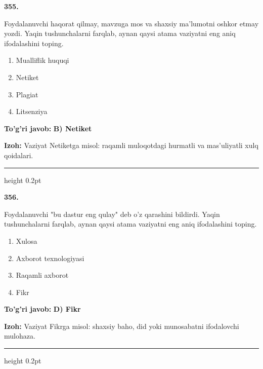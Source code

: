 \documentclass[10pt,a4paper,oneside]{article}
\begin{document}
\noindent\textbf{\color{ink}355.}
\par
Foydalanuvchi haqorat qilmay, mavzuga mos va shaxsiy ma'lumotni oshkor etmay yozdi. Yaqin tushunchalarni farqlab, aynan qaysi atama vaziyatni eng aniq ifodalashini toping.
\begin{enumerate}[label=\Alph*),leftmargin=9mm]
\item Mualliflik huquqi
\item Netiket
\item Plagiat
\item Litsenziya
\end{enumerate}
\begin{tcolorbox}[enhanced,breakable,colback=teal!4,colframe=teal!50!black,boxrule=0.5pt,arc=1.1mm,left=3mm,right=3mm,top=1.7mm,bottom=1.7mm,before skip=2mm,after skip=2mm]
\textbf{\color{teal}To'g'ri javob:} \textbf{B) Netiket}
\par\smallskip
\textbf{Izoh:} Vaziyat Netiketga misol: raqamli muloqotdagi hurmatli va mas'uliyatli xulq qoidalari.
\end{tcolorbox}
\vspace{2mm}\hrule height 0.2pt \vspace{3mm}

\noindent\textbf{\color{ink}356.}
\par
Foydalanuvchi "bu dastur eng qulay" deb o'z qarashini bildirdi. Yaqin tushunchalarni farqlab, aynan qaysi atama vaziyatni eng aniq ifodalashini toping.
\begin{enumerate}[label=\Alph*),leftmargin=9mm]
\item Xulosa
\item Axborot texnologiyasi
\item Raqamli axborot
\item Fikr
\end{enumerate}
\begin{tcolorbox}[enhanced,breakable,colback=teal!4,colframe=teal!50!black,boxrule=0.5pt,arc=1.1mm,left=3mm,right=3mm,top=1.7mm,bottom=1.7mm,before skip=2mm,after skip=2mm]
\textbf{\color{teal}To'g'ri javob:} \textbf{D) Fikr}
\par\smallskip
\textbf{Izoh:} Vaziyat Fikrga misol: shaxsiy baho, did yoki munosabatni ifodalovchi mulohaza.
\end{tcolorbox}
\vspace{2mm}\hrule height 0.2pt \vspace{3mm}
\end{document}
